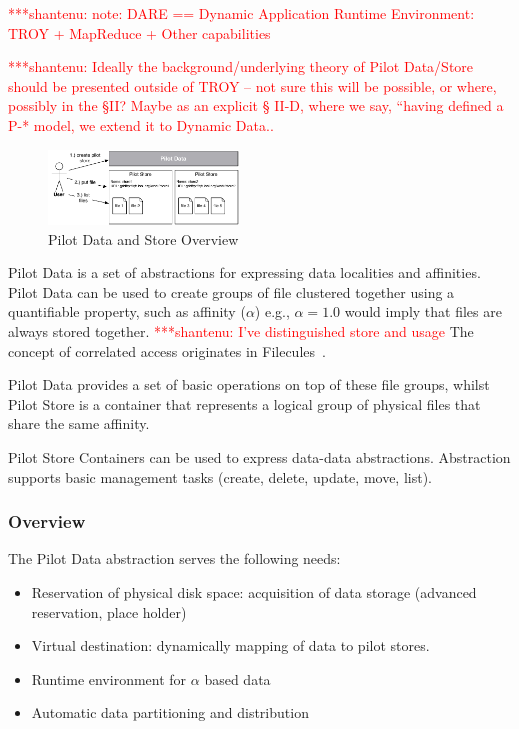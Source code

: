 \documentclass[conference,final]{IEEEtran}
\newcommand{\jhanote}[1]{ {\textcolor{red} { ***shantenu: #1 }}}
\newcommand{\jhanote}[1]{}
\begin{document}
\jhanote{note: DARE == Dynamic Application Runtime Environment: TROY +
  MapReduce + Other capabilities}

\jhanote{Ideally the background/underlying theory of Pilot Data/Store
  should be presented outside of TROY -- not sure this will be
  possible, or where, possibly in the \S II? Maybe as an explicit \S
  II-D, where we say, ``having defined a P-* model, we extend it to
  Dynamic Data..}

\label{sec:pilot-data}
\begin{figure}[t]
    \centering
        \includegraphics[width=0.45\textwidth]{figures/pilotstore.pdf}
    \caption{Pilot Data and Store Overview}
    \label{fig:figures_pilotstore}
\end{figure}

Pilot Data is a set of abstractions for expressing data localities and
affinities. Pilot Data can be used to create groups of file clustered
together using a quantifiable property, such as affinity ($\alpha$)
e.g., $\alpha = 1.0$ would imply that files are always stored
together. \jhanote{I've distinguished store and usage} The concept of
correlated access originates in
Filecules~\cite{Doraimani:2008:FGS:1383422.1383429}.

Pilot Data provides a set of basic operations on top of these file
groups, whilst Pilot Store is a container that represents a logical
group of physical files that share the same affinity.

Pilot Store Containers can be used to express data-data abstractions. 
Abstraction supports basic management tasks (create, delete, update,
move, list). 

\subsubsection{Overview}

The Pilot Data abstraction serves the following needs:
\begin{itemize}
	\item Reservation of physical disk space: acquisition of data storage (advanced reservation, place holder)
	\item Virtual destination: dynamically mapping of data to pilot stores.
	\item Runtime environment for $\alpha$ based data
	\item Automatic data partitioning and distribution
\end{itemize}
\end{document}
